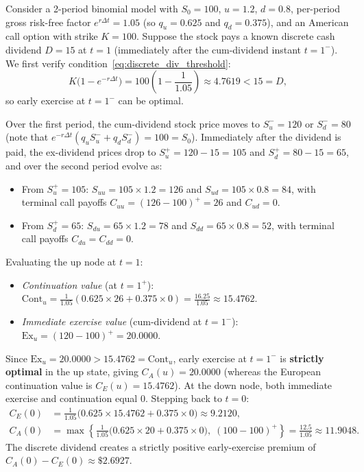 \begin{example}
\label{ex:american_call_dividend}
Consider a 2-period binomial model with $S_0 = 100$, $u = 1.2$, $d = 0.8$, per-period gross risk-free factor $e^{r\Delta t} = 1.05$ (so $q_u = 0.625$ and $q_d = 0.375$), and an American call option with strike $K = 100$. Suppose the stock pays a known discrete cash dividend $D = 15$ at $t = 1$ (immediately after the cum-dividend instant $t = 1^-$). We first verify condition~\eqref{eq:discrete_div_threshold}:
\[
    K\bigl(1 - e^{-r\Delta t}\bigr) = 100\left(1 - \frac{1}{1.05}\right) \approx 4.7619 < 15 = D,
\]
so early exercise at $t = 1^-$ can be optimal.

Over the first period, the cum-dividend stock price moves to $S_u^- = 120$ or $S_d^- = 80$ (note that $e^{-r\Delta t}(q_u S_u^- + q_d S_d^-) = 100 = S_0$). Immediately after the dividend is paid, the ex-dividend prices drop to $S_u^+ = 120 - 15 = 105$ and $S_d^+ = 80 - 15 = 65$, and over the second period evolve as:
\begin{itemize}
    \item From $S_u^+ = 105$: $S_{uu} = 105 \times 1.2 = 126$ and $S_{ud} = 105 \times 0.8 = 84$, with terminal call payoffs $C_{uu} = (126 - 100)^+ = 26$ and $C_{ud} = 0$.
    \item From $S_d^+ = 65$: $S_{du} = 65 \times 1.2 = 78$ and $S_{dd} = 65 \times 0.8 = 52$, with terminal call payoffs $C_{du} = C_{dd} = 0$.
\end{itemize}
Evaluating the up node at $t = 1$:
\begin{itemize}
    \item \emph{Continuation value} (at $t = 1^+$): $\text{Cont}_u = \frac{1}{1.05}(0.625 \times 26 + 0.375 \times 0) = \frac{16.25}{1.05} \approx 15.4762$.
    \item \emph{Immediate exercise value} (cum-dividend at $t = 1^-$): $\text{Ex}_u = (120 - 100)^+ = 20.0000$.
\end{itemize}
Since $\text{Ex}_u = 20.0000 > 15.4762 = \text{Cont}_u$, early exercise at $t = 1^-$ is \textbf{strictly optimal} in the up state, giving $C_A(u) = 20.0000$ (whereas the European continuation value is $C_E(u) = 15.4762$). At the down node, both immediate exercise and continuation equal $0$. Stepping back to $t = 0$:
\begin{align*}
    C_E(0) &= \frac{1}{1.05}\bigl(0.625 \times 15.4762 + 0.375 \times 0\bigr) \approx 9.2120, \\
    C_A(0) &= \max\left\{\frac{1}{1.05}\bigl(0.625 \times 20 + 0.375 \times 0\bigr),\; (100 - 100)^+\right\} = \frac{12.5}{1.05} \approx 11.9048.
\end{align*}
The discrete dividend creates a strictly positive early-exercise premium of $C_A(0) - C_E(0) \approx \$2.6927$.
\end{example}

